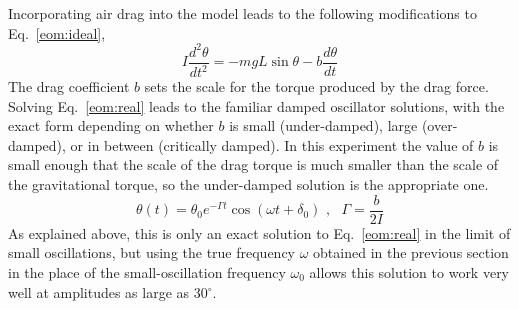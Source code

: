 \documentclass{revtex4}
\begin{document}
Incorporating air drag into the model leads to the following modifications
to Eq.~\ref{eom:ideal},
\begin{equation}
I\frac{d^2\theta}{dt^2} = -mgL \sin{\theta} -b\frac{d\theta}{dt}
\label{eom:real}
\end{equation}
The drag coefficient $b$ sets the scale for the torque produced by the
drag force.  Solving Eq.~\ref{eom:real} leads to the familiar damped
oscillator solutions, with the exact form depending on whether $b$ is
small (under-damped), large (over-damped), or in between (critically damped).
In this experiment the value of $b$ is small enough that the scale of the
drag torque is much smaller than the scale of the gravitational torque,
so the under-damped solution is the appropriate one.
\begin{equation}
\theta(t)=\theta_0 e^{-\Gamma t} \cos(\omega t + \delta_0)\,\,
,\,\,\,\,\Gamma=\frac{b}{2I}
\label{sol:damped}
\end{equation}
As explained above, this is only an exact solution to Eq.~\ref{eom:real}
in the limit of small oscillations, but using the true frequency $\omega$
obtained in the previous section in the place of the small-oscillation
frequency $\omega_0$ allows this solution to work very well at amplitudes
as large as 30$^{\circ}$.
\end{document}
